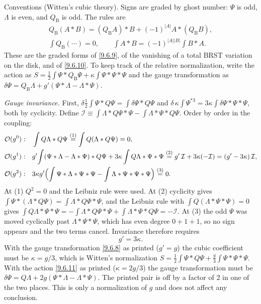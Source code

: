 \begin{tcolorbox}[breakable]
	\begin{remark}
		Conventions (Witten's cubic theory). Signs are graded by ghost number: $\Psi$ is odd, $\Lambda$ is even, and $Q_{\mathrm B}$ is odd. The rules are
		\begin{gather*}
			Q_{\mathrm B}(A*B)=(Q_{\mathrm B}A)*B+(-1)^{|A|}A*(Q_{\mathrm B}B),\\
			\int Q_{\mathrm B}(\cdots)=0,\qquad\int A*B=(-1)^{|A||B|}\int B*A .
		\end{gather*}
		These are the graded forms of \eqref{9.6.9}, of the vanishing of a total BRST variation on the disk, and of \eqref{9.6.10}. To keep track of the relative normalization, write the action as $S=\frac12\int\Psi*Q_{\mathrm B}\Psi+\kappa\int\Psi*\Psi*\Psi$ and the gauge transformation as $\delta\Psi=Q_{\mathrm B}\Lambda+g'(\Psi*\Lambda-\Lambda*\Psi)$.

		\emph{Gauge invariance.} First, $\delta\frac12\int\Psi*Q\Psi=\int\delta\Psi*Q\Psi$ and $\delta\,\kappa\int\Psi^{*3}=3\kappa\int\delta\Psi*\Psi*\Psi$, both by cyclicity. Define $\mathcal I\equiv\int\Lambda*Q\Psi*\Psi-\int\Lambda*\Psi*Q\Psi$. Order by order in the coupling:
		\begin{align*}
			\mathcal O(g^0):&\quad\int Q\Lambda*Q\Psi\overset{(1)}{=}\int Q(\Lambda*Q\Psi)=0,\\
			\mathcal O(g^1):&\quad g'\!\int(\Psi*\Lambda-\Lambda*\Psi)*Q\Psi+3\kappa\int Q\Lambda*\Psi*\Psi\overset{(2)}{=}g'\,\mathcal I+3\kappa(-\mathcal I)=(g'-3\kappa)\,\mathcal I,\\
			\mathcal O(g^2):&\quad 3\kappa g'\Bigl(\int\Psi*\Lambda*\Psi*\Psi-\int\Lambda*\Psi*\Psi*\Psi\Bigr)\overset{(3)}{=}0 .
		\end{align*}
		At (1) $Q^2=0$ and the Leibniz rule were used. At (2) cyclicity gives $\int\Psi*(\Lambda*Q\Psi)=\int\Lambda*Q\Psi*\Psi$, and the Leibniz rule with $\int Q(\Lambda*\Psi*\Psi)=0$ gives $\int Q\Lambda*\Psi*\Psi=-\int\Lambda*Q\Psi*\Psi+\int\Lambda*\Psi*Q\Psi=-\mathcal I$. At (3) the odd $\Psi$ was moved cyclically past $\Lambda*\Psi*\Psi$, which has even degree $0+1+1$, so no sign appears and the two terms cancel. Invariance therefore requires
		\begin{equation*}
			\boxed{g'=3\kappa} .
		\end{equation*}
		With the gauge transformation \eqref{9.6.8} as printed ($g'=g$) the cubic coefficient must be $\kappa=g/3$, which is Witten's normalization $S=\frac12\int\Psi*Q\Psi+\frac g3\int\Psi*\Psi*\Psi$. With the action \eqref{9.6.11} as printed ($\kappa=2g/3$) the gauge transformation must be $\delta\Psi=Q\Lambda+2g(\Psi*\Lambda-\Lambda*\Psi)$. The printed pair is off by a factor of 2 in one of the two places. This is only a normalization of $g$ and does not affect any conclusion.


\end{remark}
\end{tcolorbox}
